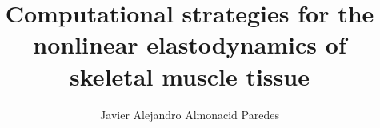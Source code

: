 \documentclass{sfuthesis}
\title{Computational strategies for the nonlinear elastodynamics of skeletal muscle tissue}
\author{Javier Alejandro Almonacid Paredes}
\numberwithin{equation}{section}
\numberwithin{figure}{chapter}
\numberwithin{table}{chapter}
\theoremstyle{definition}
\begin{document}
\frontmatter
\maketitle{}
\makecommittee{}


\begin{abstract}

\end{abstract}
\end{document}
